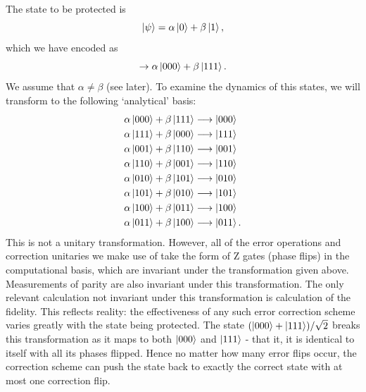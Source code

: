 \documentclass{report}
\begin{document}
\begin{appendices}
The state to be protected is
\begin{equation*}
    \ket{\psi} = \alpha \ket{0} + \beta \ket{1},
\end{equation*} which we have encoded as
\begin{equation*}
    \rightarrow \alpha \ket{000} + \beta \ket{111}.
\end{equation*}
We assume that $\alpha \neq \beta$ (see later). To examine the dynamics of this states, we will transform to the following `analytical' basis:
\begin{align*}
    \alpha \ket{000}+ \beta \ket{111} &\longrightarrow \ket{000}\\
    \alpha \ket{111}+ \beta \ket{000} &\longrightarrow \ket{111}\\
    \alpha \ket{001}+ \beta \ket{110} &\longrightarrow \ket{001}\\
    \alpha \ket{110}+ \beta \ket{001} &\longrightarrow \ket{110}\\
    \alpha \ket{010}+ \beta \ket{101} &\longrightarrow \ket{010}\\
    \alpha \ket{101}+ \beta \ket{010} &\longrightarrow \ket{101}\\
    \alpha \ket{100}+ \beta \ket{011} &\longrightarrow \ket{100}\\
    \alpha \ket{011}+ \beta \ket{100} &\longrightarrow \ket{011}.
\end{align*}
This is not a unitary transformation. However, all of the error operations and correction unitaries we make use of take the form of Z gates (phase flips) in the computational basis, which are invariant under the transformation given above. Measurements of parity are also invariant under this transformation. The only relevant calculation not invariant under this transformation is calculation of the fidelity. This reflects reality: the effectiveness of any such error correction scheme varies greatly with the state being protected. The state $(\ket{000} + \ket{111})/\sqrt{2}$ breaks this transformation as it maps to both $\ket{000}$ and $\ket{111}$ - that it, it is identical to itself with all its phases flipped. Hence no matter how many error flips occur, the correction scheme can push the state back to exactly the correct state with at most one correction flip.


\end{appendices}
\end{document}
